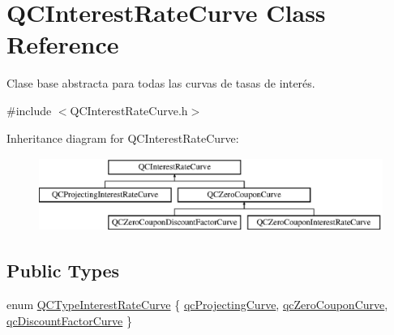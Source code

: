 \hypertarget{class_q_c_interest_rate_curve}{\section{Q\+C\+Interest\+Rate\+Curve Class Reference}
\label{class_q_c_interest_rate_curve}
}


Clase base abstracta para todas las curvas de tasas de interés.  




{\ttfamily \#include $<$Q\+C\+Interest\+Rate\+Curve.\+h$>$}

Inheritance diagram for Q\+C\+Interest\+Rate\+Curve\+:\begin{figure}[H]
\begin{center}
\leavevmode
\includegraphics[height=2.413793cm]{class_q_c_interest_rate_curve}
\end{center}
\end{figure}
\subsection*{Public Types}
\begin{DoxyCompactItemize}
\item 
enum \hyperlink{class_q_c_interest_rate_curve_a68e2145ab0bc68344bcfcdfaf592fb63}{Q\+C\+Type\+Interest\+Rate\+Curve} \{ \hyperlink{class_q_c_interest_rate_curve_a68e2145ab0bc68344bcfcdfaf592fb63a877e81812e983cf935de5f225d025305}{qc\+Projecting\+Curve}, 
\hyperlink{class_q_c_interest_rate_curve_a68e2145ab0bc68344bcfcdfaf592fb63a22386a704b2c20f8fe7e4b4461cbc22d}{qc\+Zero\+Coupon\+Curve}, 
\hyperlink{class_q_c_interest_rate_curve_a68e2145ab0bc68344bcfcdfaf592fb63a37f65bba40528ce332c6c24825e8ba17}{qc\+Discount\+Factor\+Curve}
 \}
\end{DoxyCompactItemize}
